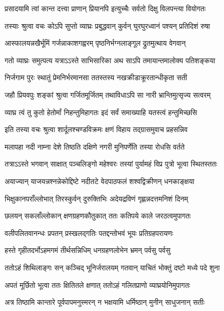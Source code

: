 \twolineshloka
{प्रसादयामि त्वां कान्त दत्त्वा प्राणान् प्रियानपि}
{इत्युच्चैः सर्वतो दिक्षु विलपन्त्या वियोगतः} %

\twolineshloka
{तस्याः श्रुत्वा वचः कोऽपि सुप्तो व्याघ्रः प्रबुद्धवान्}
{कुर्वन् घुरघुरध्वानं पश्यन् प्रतिदिशं रुषा} %

\twolineshloka
{आस्फालयन्नखैर्भूमिं गर्जन्नाकाशगह्वरम्}
{पृष्ठनिर्भग्नलाङ्गूल द्रुतमुत्थाय वेगवान्} %

\twolineshloka
{गतो व्याघ्रः समुत्पत्य यत्राऽऽस्ते साभिसारिका}
{अथ साऽपि तमायान्तमालोक्य पतिशङ्कया} %

\twolineshloka
{निर्जगाम पुरः स्थातुं प्रेमनिर्भरमानसा}
{ततस्तस्य नखक्रीडाक्रूरतान्धीकृता सती} %

\twolineshloka
{जहौ प्रियवपुः शङ्कां श्रुत्वा गर्जितमूर्जितम्}
{तथाविधाऽपि सा नारी भ्रान्तिमुत्सृज्य सत्वरम्} %

\twolineshloka
{व्याघ्र त्वं तु कुतो हेतोर्मां निहन्तुमिहागतः}
{इदं सर्वं समाख्याहि यतस्त्वं हन्तुमिच्छसि} %

\twolineshloka
{इति तस्या वचः श्रुत्वा शार्दूलश्चण्डविक्रमः}
{क्षणं विहाय तद्ग्रासमुवाच प्रहसन्निव} %

\twolineshloka
{मलापहा नदी नाम्ना देशे तिष्ठति दक्षिणे}
{नगरी मुनिपर्णेति तस्या रोधसि वर्तते} %

\twolineshloka
{तत्राऽऽस्ते भगवान् साक्षात् पञ्चलिङ्गो महेश्वरः}
{तस्यां पुर्यामहं विप्र पुत्रो भूत्वा स्थितस्ततः} %

\twolineshloka
{अयाज्यान् याजयन्नश्नन्नेकोद्दिष्टे नदीतटे}
{वेदपाठफलं शश्वद्विक्रीणन् धनकाङ्क्षया} %

\twolineshloka
{भिक्षुकानपराँल्लोभात् तिरस्कुर्वन् दुरुक्तिभिः}
{अदेयद्रविणं गृह्णन्नदत्तमनिशं दिनम्} %

\twolineshloka
{छलयन् सकलाँल्लोकान् क्षणग्रहणकौतुकात्}
{ततः कतिपये काले जरठत्वमुपागतः} %

\twolineshloka
{वलीपलितवानन्धः प्रपतन् प्रस्खलद्गतिः}
{पतद्दन्तोभवं भूयः प्रतिग्रहपरायणः} %

\twolineshloka
{हस्ते गृहीतदर्भोऽहमगमं तीर्थसन्निधिम्}
{धनग्रहणलोभेन भ्रमन् पर्वसु पर्वसु} %

\twolineshloka
{ततोऽहं शिथिलाङ्गः सन् कञ्चिद् भूनिर्जरालयम्}
{गतवान् याचितं भोक्तुं दष्टो मध्ये पदे शुना} %

\twolineshloka
{अपतं मूर्छितो भूत्वा ततः क्षितितले क्षणात्}
{ततोऽहं गलितप्राणो व्याघ्रयोनिमुपागतः} %

\twolineshloka
{अत्र तिष्ठामि कान्तारे पूर्वपापमनुस्मरन्}
{न भक्षयामि धर्मिष्ठान् मुनीन् साधुजनान् सतीः} %

